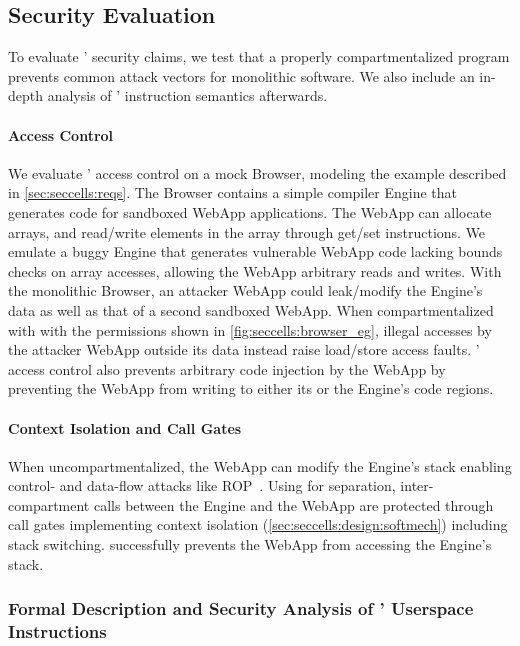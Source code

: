 \subsection{Security Evaluation}
\label{sec:seccells:evaluation:sec}

To evaluate \seccells' security claims, we test that a properly 
compartmentalized \seccells program prevents common attack vectors
for monolithic software.
We also include an in-depth analysis of \seccells' instruction semantics
afterwards.

\paragraph{Access Control}
We evaluate \seccells' access control on a mock Browser,
modeling the example described in \autoref{sec:seccells:reqs}.
The Browser contains a simple compiler Engine that generates code for
sandboxed WebApp applications.
The WebApp can allocate arrays, and read/write elements in the array through
get/set instructions.
We emulate a buggy Engine that generates vulnerable WebApp code lacking bounds 
checks on array accesses, allowing the WebApp arbitrary reads and writes.
With the monolithic Browser, an attacker WebApp could leak/modify the
Engine's data as well as that of a second sandboxed WebApp.
When compartmentalized with \seccells with the permissions shown in 
\autoref{fig:seccells:browser_eg}, illegal accesses by the attacker WebApp outside its
data \cell instead raise load/store access faults.
\seccells' access control also prevents arbitrary code injection by the WebApp
by preventing the WebApp from writing to either its or the Engine's code regions.

\paragraph{Context Isolation and Call Gates}
When uncompartmentalized, the WebApp can modify the Engine's stack enabling
control- and data-flow attacks like ROP~\cite{Shacham07}.
Using \seccells for separation, inter-compartment calls between the 
Engine and the WebApp are protected through call gates 
implementing context isolation (\autoref{sec:seccells:design:softmech}) including
stack switching.
\seccells successfully prevents the WebApp from accessing the Engine's stack.

\subsubsection{Formal Description and Security Analysis of \seccells' 
Userspace Instructions}

